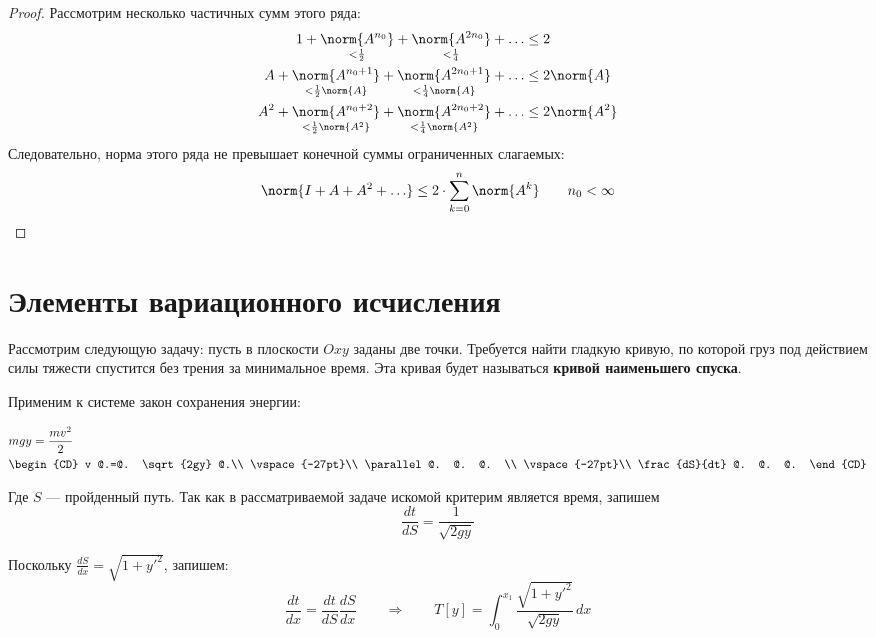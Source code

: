 \begin{proof}
		Рассмотрим несколько частичных сумм этого ряда:
		\begin{align*}
			1 + \underset{< \frac{1}{2}}{\norm{A^{n_0}}} + \underset{< \frac{1}{4}}{\norm{A^{2n_0}}} + \ldots &\leq 2 \\
			A + \underset{< \frac{1}{2}\norm{A}}{\norm{A^{n_0+1}}} 
			+ \underset{< \frac{1}{4}\norm{A}}{\norm{A^{2n_0+1}}} + \ldots &\leq 2 \norm{A} \\
			A^2 + \underset{< \frac{1}{2}\norm{A^2}}{\norm{A^{n_0+2}}} 
			+ \underset{< \frac{1}{4}\norm{A^2}}{\norm{A^{2n_0+2}}} + \ldots &\leq 2 \norm{A^2} \\
		\end{align*}
		Следовательно, норма этого ряда не превышает конечной суммы ограниченных слагаемых:
		$$\norm{I + A + A^2 + \ldots} \leq 2\cdot\sum_{k=0}^n\norm{A^k} \qquad n_0 < \infty$$
	\end{proof}
	
	\section{Элементы вариационного исчисления}
	
	Рассмотрим следующую задачу: пусть в плоскости $Oxy$ заданы две точки. Требуется найти гладкую кривую, 
	по которой груз под действием силы тяжести спустится без трения за минимальное время. Эта кривая будет
	называться \textbf{кривой наименьшего спуска}.
	
	
	Применим к системе закон сохранения энергии:
	
	\begin{align*}
		&mgy = \frac{mv^2}{2} \\
		&\begin{CD}
			v @.=@. \sqrt{2gy} @.\\
			\vspace{-27pt}\\
			\parallel @. @. @. \\
			\vspace{-27pt}\\
			\frac{dS}{dt} @. @. @.
		\end{CD}
	\end{align*}
	
	Где $S$ --- пройденный путь. Так как в рассматриваемой задаче искомой критерим является время, запишем
	$$\frac{dt}{dS} = \frac{1}{\sqrt{2gy}}$$
	
	Поскольку $\frac{dS}{dx} = \sqrt{1 + y'^2}$, запишем:
	$$\frac{dt}{dx} = \frac{dt}{dS} \frac{dS}{dx} \qquad\Rightarrow\qquad 
	  T[y] = \int_0^{x_1} \frac{\sqrt{1+y'^2}}{\sqrt{2gy}} \, dx$$
	  
